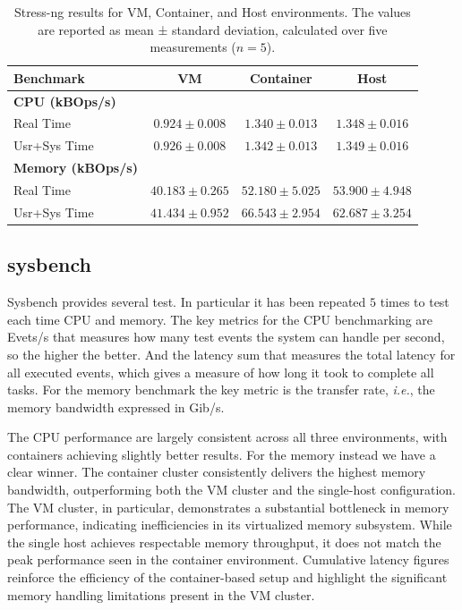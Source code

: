 \begin{table}[htbp]
    \centering
    \begin{tabular}{lccc}
    \toprule
    \textbf{Benchmark} & \textbf{VM} & \textbf{Container} & \textbf{Host} \\
    \midrule
    \textbf{CPU (kBOps/s)} & & & \\
    Real Time & $0.924 \pm 0.008$ & $1.340 \pm 0.013$ & $1.348 \pm 0.016$ \\
    Usr+Sys Time & $0.926 \pm 0.008$ & $1.342 \pm 0.013$ & $1.349 \pm 0.016$ \\
    \midrule
    \textbf{Memory (kBOps/s)} & & & \\
    Real Time & $40.183 \pm 0.265$ & $52.180 \pm 5.025$ & $53.900 \pm 4.948$ \\
    Usr+Sys Time & $41.434 \pm 0.952$ & $66.543 \pm 2.954$ & $62.687 \pm 3.254$ \\
    \bottomrule
    \end{tabular}
    \caption{Stress-ng results for VM, Container, and Host environments. The values are reported as mean ± standard deviation, calculated over five measurements ($n = 5$).}
    \label{tab:stress-ng}
\end{table}


\subsection{sysbench}


Sysbench provides several test. In particular it has been repeated $5$ times to test each time CPU and memory. The key metrics for the CPU benchmarking are Evets/s that measures how many test events the system can handle per second, so the higher the better. And the latency sum that measures the total latency for all executed events, which gives a measure of how long it took to complete all tasks. For the memory benchmark the key metric is the transfer rate, \textit{i.e.}, the memory bandwidth expressed in Gib/s.

The CPU performance are largely consistent across all three environments, with containers achieving slightly better results. For the memory instead we have a clear winner. The container cluster consistently delivers the highest memory bandwidth, outperforming both the VM cluster and the single-host configuration. The VM cluster, in particular, demonstrates a substantial bottleneck in memory performance, indicating inefficiencies in its virtualized memory subsystem. While the single host achieves respectable memory throughput, it does not match the peak performance seen in the container environment. Cumulative latency figures reinforce the efficiency of the container-based setup and highlight the significant memory handling limitations present in the VM cluster.

